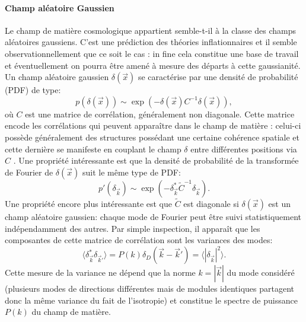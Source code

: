 \paragraph{Champ aléatoire Gaussien} Le champ de matière cosmologique appartient semble-t-il à la classe des champs aléatoires gaussiens. C'est une prédiction des théories inflationnaires et il semble observationnellement que ce soit le cas : in fine cela constitue une base de travail et éventuellement on pourra être amené à mesure des départs à cette gaussianité. Un champ aléatoire gaussien $\delta(\vec x)$ se caractérise par une densité de probabilité (PDF)  de type:
\begin{equation}
p(\delta(\vec x)) \sim \exp( -\delta (\vec x) C^{-1} \delta (\vec x)),
\end{equation}
où $C$ est une matrice de corrélation, généralement non diagonale. Cette matrice encode les corrélations qui peuvent apparaître dans le champ de matière : celui-ci possède généralement des structures possédant une certaine cohérence spatiale et cette dernière se manifeste en couplant le champ $\delta$ entre différentes positions via $C$ . Une propriété intéressante est que la densité de probabilité de la transformée de Fourier de $\delta (\vec x)$ suit le même type de PDF:
\begin{equation}
p'(\delta_{\vec k})\sim \exp( -\delta_{\vec k}^* \tilde C^{-1} \delta_{\vec k}).
\end{equation}
Une propriété encore plus intéressante est que $\tilde C$ est diagonale si $\delta(\vec x)$ est un champ aléatoire gaussien: chaque mode de Fourier peut être suivi statistiquement indépendamment des autres. Par simple inspection, il apparaît que les composantes de cette matrice de corrélation sont les variances des modes:
\begin{equation}
\langle \delta_{\vec k}^* \delta_{\vec k'}\rangle = P(k)\delta_D(\vec k -\vec k')=\langle|\delta_{\vec k}|^2\rangle.
\end{equation}
Cette mesure de la variance ne dépend que la norme $k=|\vec k|$ du mode considéré (plusieurs modes de directions différentes mais de modules identiques partagent donc la même variance du fait de l'isotropie) et constitue le spectre de puissance $P(k)$ du champ de matière.

